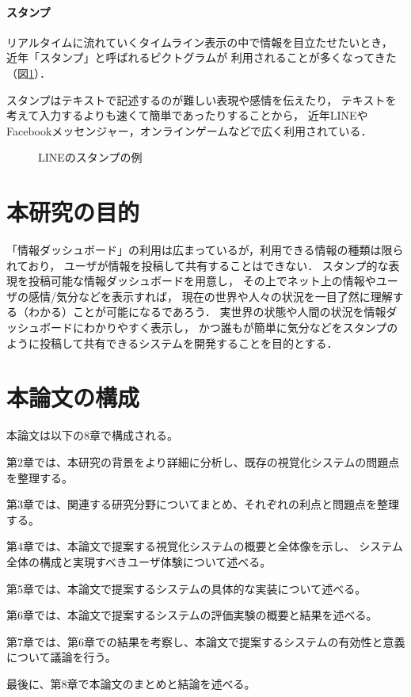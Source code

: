 \vspace{2mm}
\paragraph*{スタンプ}

リアルタイムに流れていくタイムライン表示の中で情報を目立たせたいとき，
近年「スタンプ」と呼ばれるピクトグラムが
利用されることが多くなってきた（図\ref{linestamp}）．

スタンプはテキストで記述するのが難しい表現や感情を伝えたり，
テキストを考えて入力するよりも速くて簡単であったりすることから，
近年LINEやFacebookメッセンジャー，オンラインゲームなどで広く利用されている．

\begin{figure}[H]
\centering
{}
\caption{LINEのスタンプの例}
\label{linestamp}
\end{figure}

\section{本研究の目的}
「情報ダッシュボード」の利用は広まっているが，利用できる情報の種類は限られており，
ユーザが情報を投稿して共有することはできない．
スタンプ的な表現を投稿可能な情報ダッシュボードを用意し，
その上でネット上の情報やユーザの感情/気分などを表示すれば，
現在の世界や人々の状況を一目了然に理解する（わかる）ことが可能になるであろう．
実世界の状態や人間の状況を情報ダッシュボードにわかりやすく表示し，
かつ誰もが簡単に気分などをスタンプのように投稿して共有できるシステムを開発することを目的とする．

\section{本論文の構成}

本論文は以下の8章で構成される。

第2章では、本研究の背景をより詳細に分析し、既存の視覚化システムの問題点を整理する。

第3章では、関連する研究分野についてまとめ、それぞれの利点と問題点を整理する。

第4章では、本論文で提案する視覚化システムの概要と全体像を示し、
システム全体の構成と実現すべきユーザ体験について述べる。

第5章では、本論文で提案するシステムの具体的な実装について述べる。

第6章では、本論文で提案するシステムの評価実験の概要と結果を述べる。

第7章では、第6章での結果を考察し、本論文で提案するシステムの有効性と意義について議論を行う。

最後に、第8章で本論文のまとめと結論を述べる。